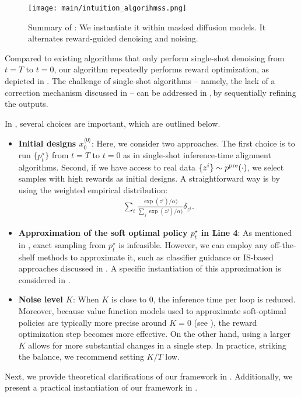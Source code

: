 \begin{figure}[!t]
    \centering
    \texttt{[image: main/intuition\_algorihmss.png]}
    \caption{Summary of \alg: We instantiate it within masked diffusion models. It alternates reward-guided denoising and noising. }
    \label{fig:refinement2}
\end{figure}

Compared to existing algorithms that only perform single-shot denoising from $t=T$ to $t=0$, our algorithm repeatedly performs reward optimization, as depicted in . The challenge of single-shot algorithms -- namely, the lack of a correction mechanism discussed in  -- can be addressed in \alg,\,by sequentially refining the outputs.


In , several choices are important, which are outlined below. 
\vspace{-2mm}
\begin{itemize}
    \item \textbf{Initial designs $x^{\langle 0 \rangle}_0$}: Here, we consider two approaches.  The first choice is to run $\{p^{\star}_t\}$ from $t=T$ to $t=0$ as in single-shot inference-time alignment algorithms. 
    Second, if we have access to real data  $\{z^i\}\sim p^{\mathrm{pre}}(\cdot)$, we select samples with high rewards as initial designs. A straightforward way is by using the weighted empirical distribution: 
    \begin{align}
        \sum_i \frac{\exp(z^i)/\alpha) }{\sum_j \exp(z^j)/\alpha)} \delta_{z^i}. 
    \end{align}
       
    \item   \textbf{Approximation of the soft optimal policy $p^{\star}_t$ in Line 4}: As mentioned in , exact sampling from $p^{\star}_t$ is infeasible. However, we can employ any off-the-shelf methods to approximate it, such as classifier guidance or IS-based approaches discussed in . A specific instantiation of this approximation is considered in .
    
    \item   \textbf{Noise level $K$}: When $K$ is close to $0$, the inference time per loop is reduced. Moreover, because value function models used to approximate soft-optimal policies are typically more precise around $K=0$ (see ), the reward optimization step becomes more effective. On the other hand, using a larger $K$ allows for more substantial changes in a single step. In practice, striking the balance, we recommend setting $K/T$ low. 
\end{itemize}

Next, we provide theoretical clarifications of our framework in . Additionally, we present a practical instantiation of our framework in .


